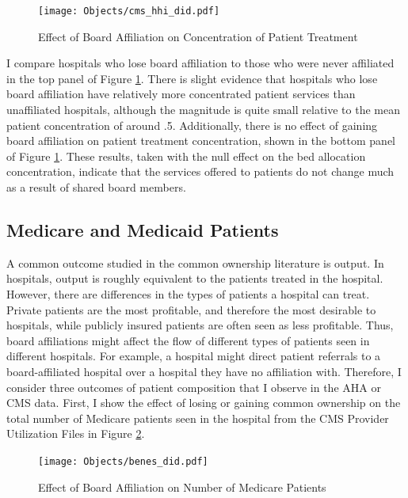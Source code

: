 \documentclass[12pt]{article}
\begin{document}
    \begin{figure}[ht!]
        \centering
        \caption{Effect of Board Affiliation on Concentration of Patient Treatment}
        \texttt{[image: Objects/cms\_hhi\_did.pdf]}
        \label{fig:cms_hhi_did}
    \end{figure}

    I compare hospitals who lose board affiliation to those who were never affiliated in the top panel of Figure \ref{fig:cms_hhi_did}. There is slight evidence that hospitals who lose board affiliation have relatively more concentrated patient services than unaffiliated hospitals, although the magnitude is quite small relative to the mean patient concentration of around .5. Additionally, there is no effect of gaining board affiliation on patient treatment concentration, shown in the bottom panel of Figure \ref{fig:cms_hhi_did}. These results, taken with the null effect on the bed allocation concentration, indicate that the services offered to patients do not change much as a result of shared board members. 

    \subsection{Medicare and Medicaid Patients}

    A common outcome studied in the common ownership literature is output. In hospitals, output is roughly equivalent to the patients treated in the hospital. However, there are differences in the types of patients a hospital can treat. Private patients are the most profitable, and therefore the most desirable to hospitals, while publicly insured patients are often seen as less profitable. Thus, board affiliations might affect the flow of different types of patients seen in different hospitals. For example, a hospital might direct patient referrals to a board-affiliated hospital over a hospital they have no affiliation with. Therefore, I consider three outcomes of patient composition that I observe in the AHA or CMS data. First, I show the effect of losing or gaining common ownership on the total number of Medicare patients seen in the hospital from the CMS Provider Utilization Files in Figure \ref{fig:benes_did}. 
    

    \begin{figure}[ht!]
        \centering
        \caption{Effect of Board Affiliation on Number of Medicare Patients}
        \texttt{[image: Objects/benes\_did.pdf]}
        \label{fig:benes_did}
    \end{figure}
\end{document}
